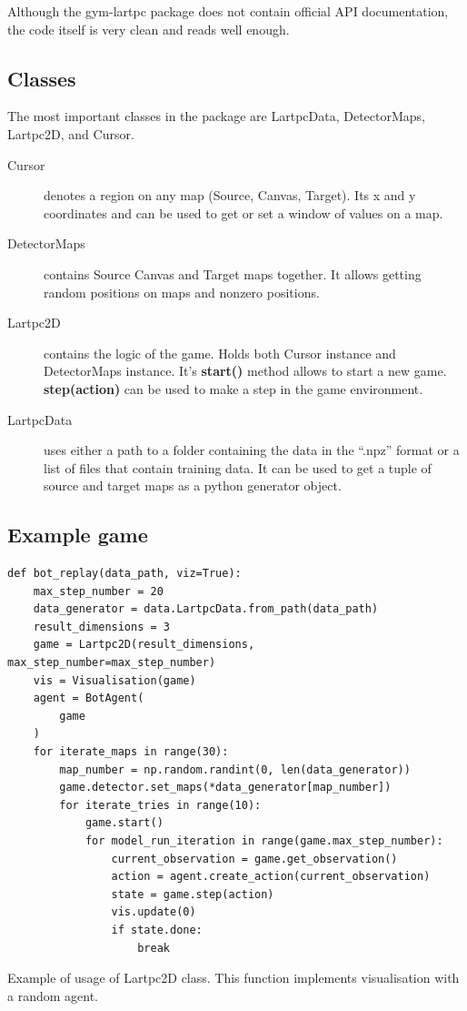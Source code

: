Although the gym-lartpc package does not contain official API documentation, the code itself is very clean and reads well enough.

\subsection{Classes}

The most important classes in the package are LartpcData, DetectorMaps, Lartpc2D, and Cursor.


\begin{description}
\item[Cursor] denotes a region on any map (Source, Canvas, Target). Its x and y coordinates and can be used to get or set a window of values on a map.

\item[DetectorMaps] contains Source Canvas and Target maps together. It allows getting random positions on maps and nonzero positions.

\item[Lartpc2D] contains the logic of the game. Holds both Cursor instance and DetectorMaps instance.
It's \textbf{start()} method allows to start a new game. \textbf{step(action)} can be used to make a step in the game environment.

\item[LartpcData] uses either a path to a folder containing the data in the ``.npz'' format or a list of files that contain training data. It can be used to get a tuple of source and target maps as a python generator object.

\end{description}

\subsection{Example game}

\begin{listing}[!ht]
\begin{verbatim}
def bot_replay(data_path, viz=True):
    max_step_number = 20
    data_generator = data.LartpcData.from_path(data_path)
    result_dimensions = 3
    game = Lartpc2D(result_dimensions, max_step_number=max_step_number)
    vis = Visualisation(game)
    agent = BotAgent(
        game
    )
    for iterate_maps in range(30):
        map_number = np.random.randint(0, len(data_generator))
        game.detector.set_maps(*data_generator[map_number])
        for iterate_tries in range(10):
            game.start()
            for model_run_iteration in range(game.max_step_number):
                current_observation = game.get_observation()
                action = agent.create_action(current_observation)
                state = game.step(action)
                vis.update(0)
                if state.done:
                    break
\end{verbatim}
\caption{Example of usage of Lartpc2D class. This function implements visualisation with a random agent.}
\label{listing:rl_example}
\end{listing}

